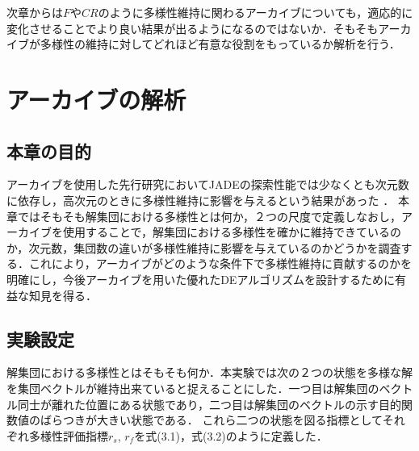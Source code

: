 \documentclass[a4paper,11pt,oneside,openany]{jsbook}
\begin{document}
次章からは$F$や$CR$のように多様性維持に関わるアーカイブについても，適応的に変化させることでより良い結果が出るようになるのではないか．そもそもアーカイブが多様性の維持に対してどれほど有意な役割をもっているか解析を行う．






\chapter{アーカイブの解析}
\section{本章の目的}
アーカイブを使用した先行研究においてJADEの探索性能では少なくとも次元数に依存し，高次元のときに多様性維持に影響を与えるという結果があった \cite{JADE} ．
本章ではそもそも解集団における多様性とは何か，２つの尺度で定義しなおし，アーカイブを使用することで，解集団における多様性を確かに維持できているのか，次元数，集団数の違いが多様性維持に影響を与えているのかどうかを調査する．これにより，アーカイブがどのような条件下で多様性維持に貢献するのかを明確にし，今後アーカイブを用いた優れたDEアルゴリズムを設計するために有益な知見を得る．

\section{実験設定}
解集団における多様性とはそもそも何か．本実験では次の２つの状態を多様な解を集団ベクトルが維持出来ていると捉えることにした．一つ目は解集団のベクトル同士が離れた位置にある状態であり，二つ目は解集団のベクトルの示す目的関数値のばらつきが大きい状態である．
これら二つの状態を図る指標としてそれぞれ多様性評価指標$r_s$, $r_f$を式(3.1)，式(3.2)のように定義した．
\end{document}
